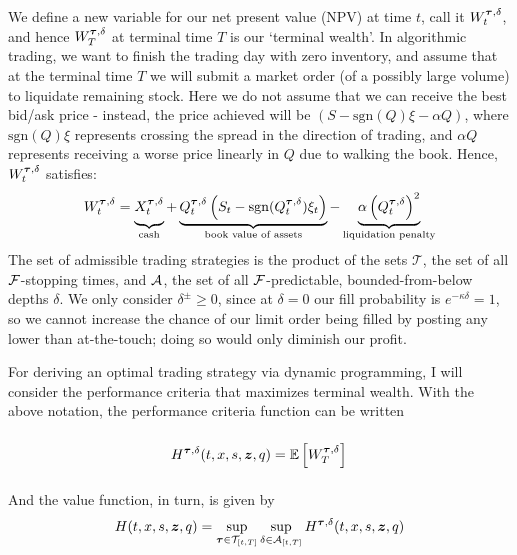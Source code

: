 We define a new variable for our net present value (NPV) at time $t$, call it $W^{\bm{\tau}, \delta}_t$, and hence $W^{\bm{\tau}, \delta}_T$ at terminal time $T$ is our `terminal wealth'. In algorithmic trading, we want to finish the trading day with zero inventory, and assume that at the terminal time $T$ we will submit a market order (of a possibly large volume) to liquidate remaining stock. Here we do not assume that we can receive the best bid/ask price - instead, the price achieved will be $(S - \mathrm{sgn}(Q)\xi - \alpha Q)$, where $\mathrm{sgn}(Q)\xi$ represents crossing the spread in the direction of trading, and $\alpha Q$ represents receiving a worse price linearly in $Q$ due to walking the book. Hence, $W^{\bm{\tau}, \delta}_t$ satisfies:
\begin{equation}\label{eq:terminalwealth}
W^{\btau, \delta}_t = \underbrace{\vphantom{\left( Q^{\btau, \delta}_t) \right)}X^{\btau, \delta}_t}_{\text{cash}}+ \underbrace{Q^{\btau, \delta}_t \left( S_t - \mathrm{sgn}(Q^{\btau, \delta}_t)\xi_t \right)}_{\text{book value of assets}} - \underbrace{\alpha \left( Q^{\btau, \delta}_t \right)^2}_{\text{liquidation penalty}}
\end{equation}
The set of admissible trading strategies is the product of the sets $\mathcal{T}$, the set of all $\mathcal{F}$-stopping times, and $\mathcal{A}$, the set of all $\mathcal{F}$-predictable, bounded-from-below depths $\delta$. We only consider $\delta^\pm \geq 0$, since at $\delta=0$ our fill probability is $e^{-\kappa\delta}=1$, so we cannot increase the chance of our limit order being filled by posting any lower than at-the-touch; doing so would only diminish our profit.

For deriving an optimal trading strategy via dynamic programming, I will consider the performance criteria that maximizes terminal wealth. With the above notation, the performance criteria function can be written 
\begin{equation}\label{eq:performancecriteria}
H^{\bm{\tau}, \delta}(t,x,s,\bm{z},q) = \mathbb{E} \left[ W_T^{\bm{\tau}, \delta} \right]\vphantom{\int\limits_t^T}
\end{equation}
And the value function, in turn, is given by
\begin{equation}\label{eq:valuefunction}
H(t,x,s,\bm{z},q) = \sup\limits_{\bm{\tau} \in \mathcal{T}_{[t,T]}} \sup\limits_{\delta \in \mathcal{A}_{[t,T]}} H^{\bm{\tau}, \delta}(t,x,s,\bm{z},q)
\end{equation}

